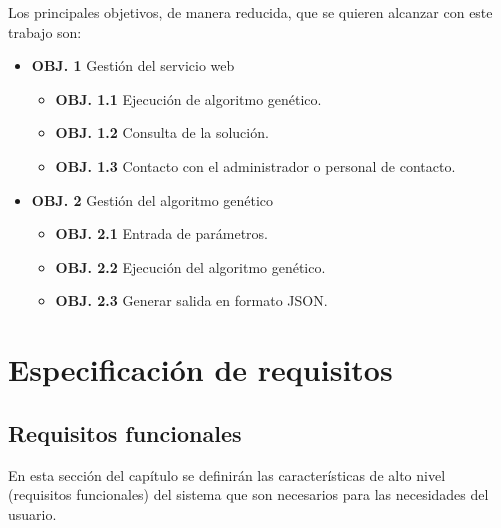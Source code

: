 Los principales objetivos, de manera reducida, que se quieren alcanzar con este trabajo son:


\begin{itemize}
	\item  \textbf{OBJ. 1} Gestión del servicio web
	\begin{itemize}
		\item \textbf{OBJ. 1.1} Ejecución de algoritmo genético.	
		\item \textbf{OBJ. 1.2} Consulta de la solución.
		\item \textbf{OBJ. 1.3} Contacto con el administrador o personal de contacto.
	\end{itemize}
		
	\item  \textbf{OBJ. 2} Gestión del algoritmo genético
	\begin{itemize}
		\item \textbf{OBJ. 2.1} Entrada de parámetros.
		\item \textbf{OBJ. 2.2} Ejecución del algoritmo genético.
		\item \textbf{OBJ. 2.3} Generar salida en formato JSON.
	\end{itemize}
	
\end{itemize}


	 

\newpage
\section{Especificación de requisitos}

\subsection{Requisitos funcionales}

\bigskip
En esta sección del capítulo se definirán las características de alto nivel (requisitos funcionales) del sistema que son necesarios para las necesidades del usuario.

\bigskip

